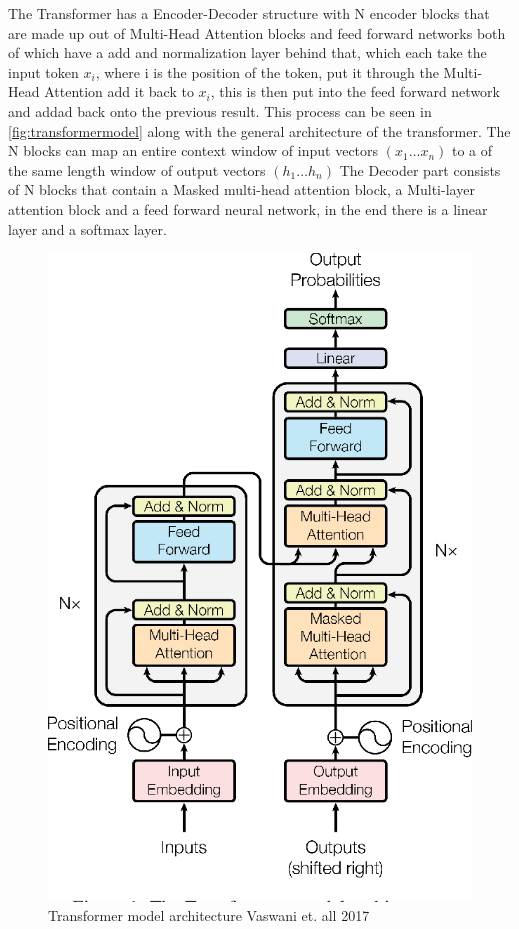 The Transformer has a Encoder-Decoder structure with N encoder blocks that are made up out of Multi-Head Attention blocks and feed forward networks both of which have a add and normalization layer behind that, which each take the input token $x_i$, where i is the position of the token, put it through the Multi-Head Attention add it back to $x_i$, this is then put into the feed forward network and addad back onto the previous result. This process can be seen in \autoref{fig:transformermodel} along with the general architecture of the transformer. 
The N blocks can map an entire context window of input vectors $(x_1\dots x_n)$ to a of the same length window of output vectors $(h_1\dots h_n)$ 
The Decoder part consists of N blocks that contain a Masked multi-head attention block, a Multi-layer attention block and a feed forward neural network, in the end there is a linear layer and a softmax layer. \cite[chapter~9]{jm3}

\begin{figure}[ht]
        \centering%
        \includegraphics[width=0.5\linewidth]{Latex//sections//images/transformermodel.png}
        \caption{Transformer model architecture Vaswani et. all 2017}
        \label{fig:transformermodel}
    \end{figure}


